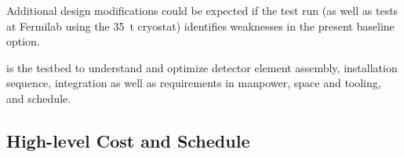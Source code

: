 Additional design modifications could be expected if the  test run (as well as tests at Fermilab using the \SI{35}{\tonne} cryostat) identifies weaknesses in the present baseline option.


 is the testbed to understand and optimize detector element assembly, installation sequence, integration as well as requirements in manpower, space and tooling, and schedule. 



%
%
%
\subsection{High-level Cost and Schedule}
\label{sec:fdsp-hv-org-cs}



